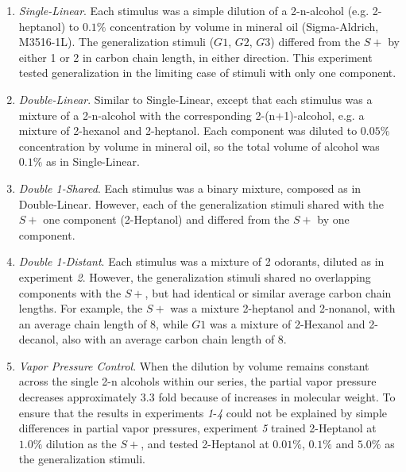\begin{enumerate}[i]
\item \textit{Single-Linear}. Each stimulus was a simple dilution of a 2-n-alcohol (e.g. 2-heptanol) to $0.1\%$ concentration by volume in mineral oil (Sigma-Aldrich, M3516-1L). The generalization stimuli ($G1$, $G2$, $G3$) differed from the $S+$ by either 1 or 2 in carbon chain length, in either direction.  This experiment tested generalization in the limiting case of stimuli with only one component.   

\item \textit{Double-Linear}. Similar to Single-Linear, except that each stimulus was a mixture of a 2-n-alcohol with the corresponding 2-(n+1)-alcohol, e.g. a mixture of 2-hexanol and 2-heptanol.  Each component was diluted to $0.05\%$ concentration by volume in mineral oil, so the total volume of alcohol was $0.1\%$ as in Single-Linear.  

\item \textit{Double 1-Shared}. Each stimulus was a binary mixture, composed as in Double-Linear. However, each of the generalization stimuli shared with the $S+$ one component (2-Heptanol) and differed from the $S+$ by one component. 

\item \textit{Double 1-Distant}. Each stimulus was a mixture of 2 odorants, diluted as in experiment \textit{2}. However, the generalization stimuli shared no overlapping components with the $S+$, but had identical or similar average carbon chain lengths. For example, the $S+$ was a mixture 2-heptanol and 2-nonanol, with an average chain length of 8, while $G1$ was a mixture of 2-Hexanol and 2-decanol, also with an average carbon chain length of 8.

\item \textit{Vapor Pressure Control}. When the dilution by volume remains constant across the single 2-n alcohols within our series, the partial vapor pressure decreases approximately 3.3 fold because of increases in molecular weight. To ensure that the results in experiments \textit{1}-\textit{4} could not be explained by simple differences in partial vapor pressures, experiment \textit{5} trained 2-Heptanol at $1.0\%$ dilution as the $S+$, and tested 2-Heptanol at $0.01\%$, $0.1\%$ and $5.0\%$ as the generalization stimuli.

\end{enumerate}

